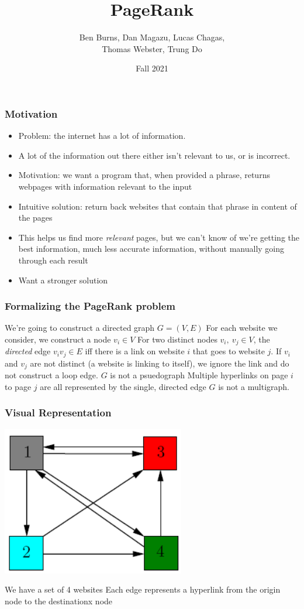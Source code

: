 \documentclass{beamer}
\title{PageRank}
\author{Ben Burns, Dan Magazu, Lucas Chagas, \\Thomas Webster, Trung Do}
\institute{MATH 455}
\date{Fall 2021}
\begin{document}
\frame{\titlepage}
\begin{frame}[t]
\frametitle{Motivation}
\begin{itemize}
    \setlength\itemsep{0.5em}
    \item Problem: the internet has a lot of information. 
    \item A lot of the information out there either isn't relevant to us, or is incorrect.
    \item Motivation: we want a program that, when provided a phrase, returns webpages with information relevant to the input
    \item Intuitive solution: return back websites that contain that phrase in content of the pages
    \item This helps us find more \emph{relevant} pages, but we can't know of we're getting the best information, much less accurate information, without manually going through each result
    \item Want a stronger solution
\end{itemize}
\end{frame}

\begin{frame}[t]
\frametitle{Formalizing the PageRank problem}
\begin{outline}
    \1 We're going to construct a directed graph $G = (V, E)$
    \1 For each website we consider, we construct a node $v_i \in V$
    \1 For two distinct nodes $v_i,\ v_j \in V$, the \emph{directed} edge $v_iv_j \in E$ iff there is a link on website $i$ that goes to website $j$.
    \1 If $v_i$ and $v_j$ are not distinct (a website is linking to itself), we ignore the link and do not construct a loop edge.
        \2 $G$ is not a psuedograph
    \1 Multiple hyperlinks on page $i$ to page $j$ are all represented by the single, directed edge 
        \2 $G$ is not a multigraph.
\end{outline}
\end{frame}

\begin{frame}
\frametitle{Visual Representation}
\begin{center}
    \includegraphics[width=0.6\textwidth]{unweighted.png}
\end{center}
\begin{outline}
    \1 We have a set of 4 websites
    \1 Each edge represents a hyperlink from the origin node to the destinationx node 
\end{outline}
\end{frame}
\end{document}

